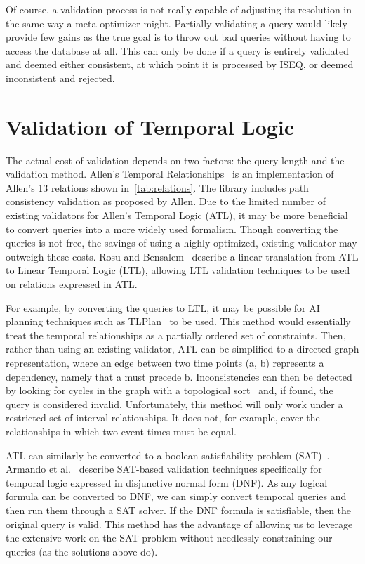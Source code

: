 \documentclass[10pt, journal]{IEEEtran}
\begin{document}
Of course, a validation process is not really capable of adjusting its resolution in the same way a meta-optimizer might.  Partially validating a query would likely provide few gains as the true goal is to throw out bad queries without having to access the database at all.  This can only be done if a query is entirely validated and deemed either consistent, at which point it is processed by ISEQ, or deemed inconsistent and rejected.

\section{Validation of Temporal Logic}
The actual cost of validation depends on two factors: the query length and the validation method. Allen's Temporal Relationships~\cite{Franke:2011} is an implementation of Allen's 13 relations shown in~\ref{tab:relations}. The library includes path consistency validation as proposed by Allen.
Due to the limited number of existing validators for Allen's Temporal Logic (ATL), it may be more beneficial to convert queries into a more widely used formalism. Though converting the queries is not free, the savings of using a highly optimized, existing validator may outweigh these costs. Rosu and Bensalem~\cite{Rosu:2006} describe a linear translation from ATL to Linear Temporal Logic (LTL), allowing LTL validation techniques to be used on relations expressed in ATL. 

For example, by converting the queries to LTL, it may be possible for AI planning techniques such as TLPlan~\cite{Bacchus:1998} to be used.  This method would essentially treat the temporal relationships as a partially ordered set of constraints.  Then, rather than using an existing validator, ATL can be simplified to a directed graph representation, where an edge between two time points (a, b) represents a dependency, namely that a must precede b.  Inconsistencies can then be detected by looking for cycles in the graph with a topological sort~\cite{Pearce:2004} and, if found, the query is considered invalid.  Unfortunately, this method will only work under a restricted set of interval relationships.  It does not, for example, cover the relationships in which two event times must be equal.

ATL can similarly be converted to a boolean satisfiability problem (SAT)~\cite{Cook:1971}. Armando et al.~\cite{Armando:1999} describe SAT-based validation techniques specifically for temporal logic expressed in disjunctive normal form (DNF).  As any logical formula can be converted to DNF, we can simply convert temporal queries and then run them through a SAT solver.  If the DNF formula is satisfiable, then the original query is valid.   This method has the advantage of allowing us to leverage the extensive work on the SAT problem without needlessly constraining our queries (as the solutions above do). 
\end{document}
